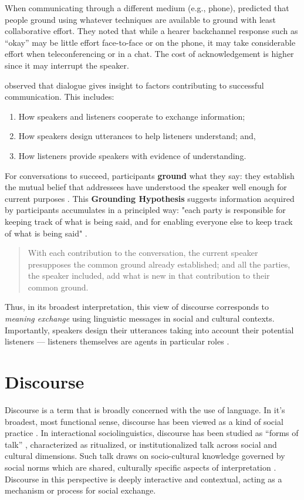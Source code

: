 When communicating through a different medium (e.g., phone),  \cite{Clark:2005wk}  predicted that people ground using whatever techniques are available to ground with least collaborative effort. They noted that while a hearer backchannel response such as ``okay'' may be little effort face-to-face or on the phone, it may take considerable effort when teleconferencing or in a chat. The cost of acknowledgement is higher since it may interrupt the speaker.
 
\cite{Clark:1996tm} observed that dialogue gives insight to factors contributing to successful communication.  This includes:
\begin{enumerate}
\item How speakers and listeners cooperate to exchange information;
\item How speakers design utterances to help listeners understand; and,
\item How listeners provide speakers with evidence of understanding.
\end{enumerate}
For conversations to succeed, participants \textbf{ground} what they say: they establish the mutual belief that addressees have understood the speaker well enough for current purposes \citep{Clark:1989ur}. This \textbf{Grounding Hypothesis} suggests information acquired by participants accumulates in a principled way: "each party is responsible for keeping track of what is being said, and for enabling everyone else to keep track of what is being said" \citep{Clark:2001uu}. 
\begin{quote}
With each contribution to the conversation, the current speaker presupposes the common ground already established; and all the parties, the speaker included, add what is new in that contribution to their common ground. \citep[208]{Clark:1992ty}
\end{quote}
Thus, in its broadest interpretation, this view of discourse corresponds to \textit{meaning exchange} using linguistic messages in social and cultural contexts. Importantly, speakers design their utterances taking into account their potential listeners --- listeners themselves are agents in particular roles \citep{Clark:1992ty}.


\section{Discourse}
\label{discourse}

Discourse is a term that is broadly concerned with the use of language. In it's broadest, most functional sense, discourse has been viewed as a kind of social practice  \citep{Goffman:1981tm,Hymes:1974wr,Leech:1983vf,gumperz:1972tf,Brown:1983wy}.  In interactional sociolinguistics, discourse has been studied as ``forms of talk''  \citep{Goffman:1981tm},  characterized as ritualized, or institutionalized talk across social and cultural dimensions. Such talk draws on socio-cultural knowledge governed by social norms which are shared, culturally specific aspects of interpretation  \citep{Gumperz:1982tc,Hymes:1974wr,Gumperz:1964ug}.  Discourse in this perspective is deeply interactive and contextual, acting as a mechanism or process for social exchange.

